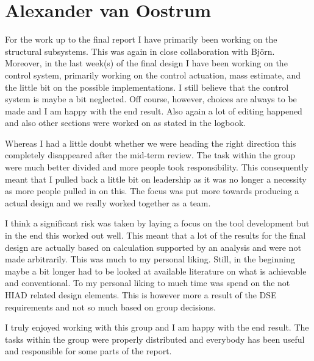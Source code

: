 \section{Alexander van Oostrum}

For the work up to the final report I have primarily been working on the structural subsystems. This was again in close collaboration with Bj\"{o}rn. Moreover, in the last week(s) of the final design I have been working on the control system, primarily working on the control actuation, mass estimate, and the little bit on the possible implementations. I still believe that the control system is maybe a bit neglected. Off course, however, choices are always to be made and I am happy with the end result. Also again a lot of editing happened and also other sections were worked on as stated in the logbook.

Whereas I had a little doubt whether we were heading the right direction this completely disappeared after the mid-term review. The task within the group were much better divided and more people took responsibility. This consequently meant that I pulled back a little bit on leadership as it was no longer a necessity as more people pulled in on this. The focus was put more towards producing a actual design and we really worked together as a team. 

I think a significant risk was taken by laying a focus on the tool development but in the end this worked out well. This meant that a lot of the results for the final design are actually based on calculation supported by an analysis and were not made arbitrarily. This was much to my personal liking. Still, in the beginning maybe a bit longer had to be looked at available literature on what is achievable and conventional. To my personal liking to much time was spend on the not HIAD related design elements. This is however more a result of the DSE requirements and not so much based on group decisions.

I truly enjoyed working with this group and I am happy with the end result. The tasks within the group were properly distributed and everybody has been useful and responsible for some parts of the report.

